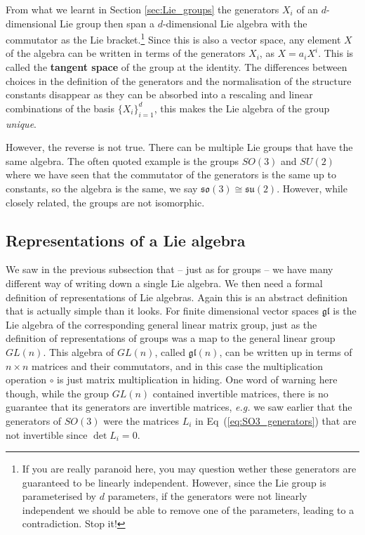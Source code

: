 \documentclass[notes.tex]{subfiles}
\begin{document}
From what we learnt in Section \ref{sec:Lie_groups} the generators $X_i$ of an $d$-dimensional Lie group then span a $d$-dimensional Lie algebra with the commutator as the Lie bracket.\footnote{If you are really paranoid here, you may question wether these generators are guaranteed to be linearly independent. However, since the Lie group is parameterised by $d$ parameters, if the generators were not linearly independent we should be able to remove one of the parameters, leading to a contradiction. Stop it!} Since this is also a vector space, any element $X$ of the algebra can be written in terms of the generators $X_i$, as $X=a_iX^i$. This is called the {\bf tangent space} of the group at the identity. The differences between choices in the definition of the generators and the normalisation of the structure constants disappear as they can be absorbed into a rescaling and linear combinations of the basis $\{X_i\}_{i=1}^d$, this makes the Lie algebra of the group {\it unique}.

However, the reverse is not true. There can be multiple Lie groups that have the same algebra. The often quoted example is the groups $SO(3)$ and $SU(2)$ where we have seen that the commutator of the generators is the same up to constants, so the algebra is the same, we say $\mathfrak{so(3)}\cong \mathfrak{su(2)}$. However, while closely related, the groups are not isomorphic. 


\subsection{Representations of a Lie algebra}
\label{sec:algebra_rep}

We saw in the previous subsection that -- just as for groups -- we have many different way of writing down a single Lie algebra. We then need a formal definition of representations of Lie algebras.
Again this is an abstract definition that is actually simple than it looks. For finite dimensional vector spaces $\mathfrak{gl}$ is the Lie algebra of the corresponding general linear matrix group, just as the definition of representations of groups was a map to the general linear group $GL(n)$. This algebra of $GL(n)$, called $\mathfrak{gl}(n)$, can be written up in terms of $n\times n$ matrices and their commutators, and in this case the multiplication operation $\circ$ is just matrix multiplication in hiding. One word of warning here though, while the group $GL(n)$ contained invertible matrices, there is no guarantee that its generators are invertible matrices, {\it e.g.} we saw earlier that the generators of $SO(3)$ were the matrices $L_i$ in Eq~(\ref{eq:SO3_generators}) that are not invertible since $\det L_i=0$.
\end{document}
